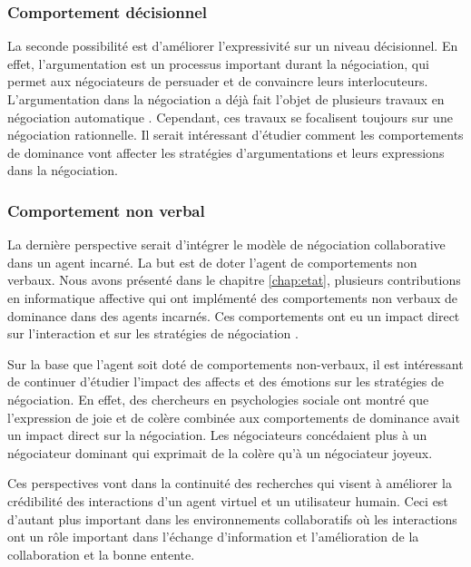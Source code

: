 	\subsubsection{Comportement décisionnel}
	La seconde possibilité est d'améliorer l'expressivité sur un niveau décisionnel. En effet, l'argumentation est un processus important durant la négociation, qui permet aux négociateurs de persuader et de convaincre leurs interlocuteurs. L'argumentation dans la négociation a déjà fait l'objet de plusieurs travaux en négociation automatique \cite{toni2010argumentative,oliva2010argumentation}. Cependant, ces travaux se focalisent toujours sur une négociation rationnelle. Il serait intéressant d'étudier comment les comportements de dominance vont affecter les stratégies d'argumentations et leurs expressions dans la négociation.
	
	\subsubsection{Comportement non verbal}
	La dernière perspective serait d'intégrer le modèle de négociation collaborative dans un agent incarné. La but est de doter l'agent de comportements non verbaux. Nous avons présenté dans le chapitre \ref{chap:etat}, plusieurs contributions en informatique affective qui ont implémenté des comportements non verbaux de dominance dans des agents incarnés. Ces comportements ont eu un impact direct sur l'interaction et sur les stratégies de négociation \cite{de2011effect,de2015humans}. 
	
	Sur la base que l'agent soit doté de comportements non-verbaux, il est intéressant de continuer d'étudier l'impact des affects et des émotions sur les stratégies de négociation.  En effet, des chercheurs en psychologies sociale \cite{van2006power} ont montré que l'expression de  joie et de colère combinée aux comportements de dominance avait un impact direct sur la négociation. Les négociateurs concédaient plus à un négociateur dominant qui exprimait de la colère qu'à un négociateur joyeux. 
	
	
	
	Ces perspectives vont dans la continuité des recherches qui visent à améliorer la crédibilité des interactions d'un agent virtuel et un utilisateur humain. Ceci est d'autant plus important dans les environnements collaboratifs où les interactions ont un rôle important dans l'échange d'information et l'amélioration de la collaboration et la bonne entente.  
	 
	
	
	 
	
	
	